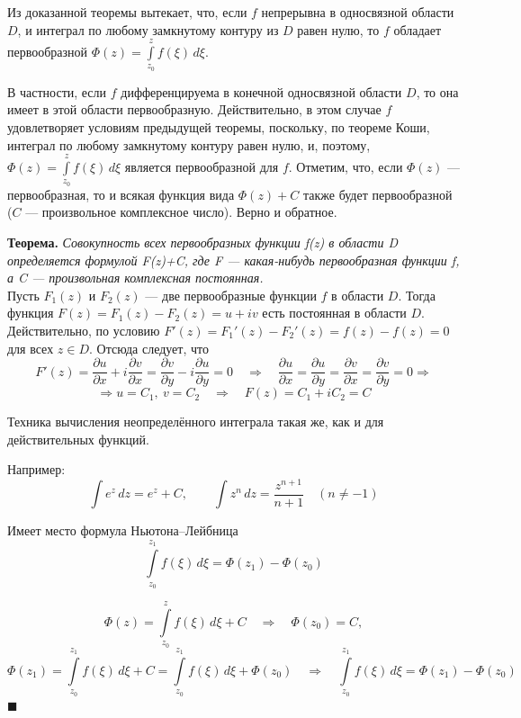 \documentclass[a4paper, 12pt]{report}
\newenvironment{Proof}
{\par\noindent{\bf Доказательство.}}
{\hfill$\scriptstyle\blacksquare$}
\begin{document}
Из доказанной теоремы вытекает, что, если $f$ непрерывна в односвязной области $D$, и интеграл по любому замкнутому контуру из $D$ равен нулю, то $f$ обладает первообразной $\Phi(z) = \int\limits_{z_0}^z f(\xi)\,d\xi$.
\par
В частности, если $f$ дифференцируема в конечной односвязной области $D$, то она имеет в этой области первообразную. Действительно, в этом случае $f$ удовлетворяет условиям предыдущей теоремы, поскольку, по теореме Коши, интеграл по любому замкнутому контуру равен нулю, и, поэтому, $\Phi(z) = \int\limits_{z_0}^z f(\xi)\,d\xi$ является первообразной для $f$. Отметим, что, если $\Phi(z)$ --- первообразная, то и всякая функция вида $\Phi(z) + C$ также будет первообразной ($C$ --- произвольное комплексное число). Верно и обратное.
\par\bigskip

\textbf{Теорема.}
\quad \textit{Совокупность всех первообразных функции f(z) в области D определяется формулой F(z)+C, где F --- какая-нибудь первообразная функции f, а C --- произвольная комплексная постоянная.} \\
\blacklozenge \hspace{4 mm}
Пусть $F_1(z)$ и $F_2(z)$ --- две первообразные функции $f$ в области $D$. Тогда функция $F(z) = F_1(z) - F_2(z) = u + iv$ есть постоянная в области $D$. Действительно, по условию $F'(z) = F_1'(z) - F_2'(z) = f(z) - f(z) = 0$ для всех $z \in D$. Отсюда следует, что
\[F'(z) = 
\frac{\partial u}{\partial x}+i\frac{\partial v}{\partial x}=
\frac{\partial v}{\partial y}-i\frac{\partial u}{\partial y}= 0 \quad \Rightarrow \quad
\frac{\partial u}{\partial x} = 
\frac{\partial u}{\partial y} = 
\frac{\partial v}{\partial x} =
\frac{\partial v}{\partial y} =
0 \Rightarrow\]
\[\Rightarrow u = C_1,\ v = C_2 \quad \Rightarrow \quad
F(z) = C_1 + iC_2 = C\] \blacksquare

\bigskip
Техника вычисления неопределённого интеграла такая же, как и для действительных функций. 

Например:
$$\int e^z\,dz = e^z + C,\qquad \int z^n\,dz = \frac{z^{n+1}}{n+1}\quad (n \ne -1)$$
\par\bigskip

Имеет место формула Ньютона--Лейбница
$$\int\limits_{z_0}^{z_1}f(\xi)\,d\xi = \Phi(z_1)-\Phi(z_0)$$

\begin{Proof}
\[\Phi(z) = \int\limits_{z_0}^{z}f(\xi)\,d\xi + C \quad \Rightarrow \quad \Phi(z_0) = C,\]
\[\Phi(z_1) =  \int\limits_{z_0}^{z_1}f(\xi)\,d\xi + C = \int\limits_{z_0}^{z_1}f(\xi)\,d\xi + \Phi(z_0) \quad \Rightarrow \quad \int\limits_{z_0}^{z_1}f(\xi)\,d\xi = \Phi(z_1) - \Phi(z_0)\]
\end{Proof}
\end{document}
